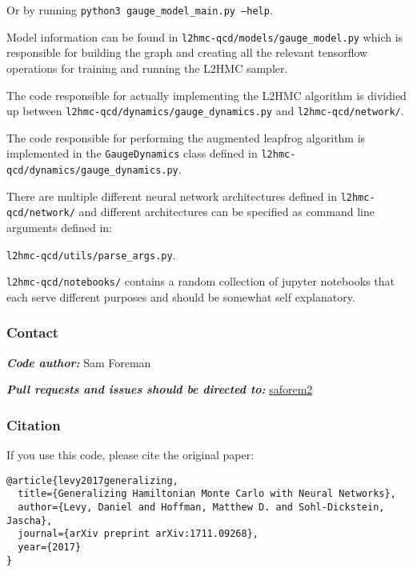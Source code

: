 \vspace{5px}
\noindent
Or by running \texttt{python3 gauge\_model\_main.py --help}.
%

\vspace{10px}
\noindent
Model information can be found in
\texttt{l2hmc-qcd/models/gauge\_model.py} which is responsible for
building the graph and creating all the relevant tensorflow operations
for training and running the L2HMC sampler.

\vspace{10px}
\noindent
The code responsible for actually implementing the L2HMC algorithm is
dividied up between \texttt{l2hmc-qcd/dynamics/gauge\_dynamics.py} and
\texttt{l2hmc-qcd/network/}.

\vspace{10px}
\noindent
The code responsible for performing the augmented leapfrog algorithm is
implemented in the \texttt{GaugeDynamics} class defined in
\texttt{l2hmc-qcd/dynamics/gauge\_dynamics.py}.

\vspace{10px}
\noindent
There are multiple different neural network architectures defined in
\texttt{l2hmc-qcd/network/} and different architectures can be specified
as command line arguments defined in:

\texttt{l2hmc-qcd/utils/parse\_args.py}.

\vspace{10px}
\noindent
\texttt{l2hmc-qcd/notebooks/} contains a random collection of jupyter
notebooks that each serve different purposes and should be somewhat self
explanatory.

\hypertarget{contact}{%
\subsubsection{Contact}\label{contact}}

\textbf{\emph{Code author:}} Sam Foreman

\noindent
\textbf{\emph{Pull requests and issues should be directed to:}}
\href{http://github.com/saforem2}{saforem2}

\hypertarget{citation}{%
\subsubsection{Citation}\label{citation}}

If you use this code, please cite the original paper:

\begin{verbatim}
@article{levy2017generalizing,
  title={Generalizing Hamiltonian Monte Carlo with Neural Networks},
  author={Levy, Daniel and Hoffman, Matthew D. and Sohl-Dickstein, Jascha},
  journal={arXiv preprint arXiv:1711.09268},
  year={2017}
}
\end{verbatim}
